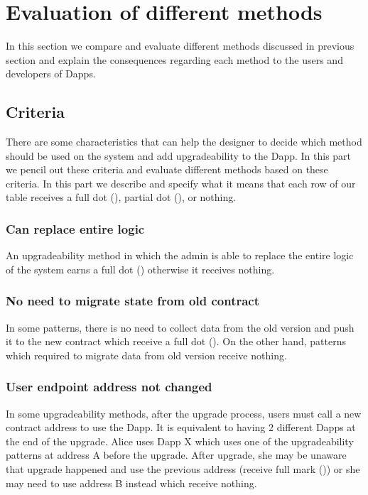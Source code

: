



 \section{Evaluation of different methods}
 In this section we compare and evaluate different methods discussed in previous section and explain the consequences regarding each method to the users and developers of Dapps.
 \subsection{Criteria}
 There are some characteristics that can help the designer to decide which method should be used on the system and add upgradeability to the Dapp. In this part we pencil out these criteria and evaluate different methods based on these criteria. In this part we describe and specify what it means that each row of our table receives a full dot (\full), partial dot (\prt), or nothing. 
 
\subsubsection{Can replace entire logic}
An upgradeability method in which the admin is able to replace the entire logic of the system earns a full dot (\full) otherwise it receives nothing.

\subsubsection{No need to migrate state from old contract}
In some patterns, there is no need to collect data from the old version and push it to the new contract which receive a full dot (\full). On the other hand, patterns which required to migrate data from old version receive nothing.

\subsubsection{User endpoint address not changed}
In some upgradeability methods, after the upgrade process, users must call a new contract address to use the Dapp. It is equivalent to having 2 different Dapps at the end of the upgrade. Alice uses Dapp X which uses one of the upgradeability patterns at address A before the upgrade. After upgrade, she may be unaware that upgrade happened and use the previous address (receive full mark (\full)) or she may need to use address B instead which receive nothing.

